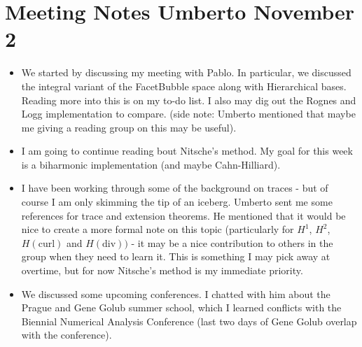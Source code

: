 \documentclass[12pt,a4paper]{article}
\begin{document}
\newpage








\section{Meeting Notes Umberto November 2}

\begin{itemize}

\item We started by discussing my meeting with Pablo. In particular, we discussed the integral variant of the FacetBubble space along with Hierarchical bases. Reading more into this is on my to-do list. I also may dig out the Rognes and Logg implementation to compare. (side note: Umberto mentioned that maybe me giving a reading group on this may be useful). 



\item I am going to continue reading bout Nitsche's method. My goal for this week is a biharmonic implementation (and maybe Cahn-Hilliard). 



\item I have been working through some of the background on traces - but of course I am only skimming the tip of an iceberg. Umberto sent me some references for trace and extension theorems. He mentioned that it would be nice to create a more formal note on this topic (particularly for $H^1$, $H^2$, $H(\text{curl})$ and $H(\text{div}))$ - it may be a nice contribution to others in the group when they need to learn it. This is something I may pick away at overtime, but for now Nitsche's method is my immediate priority.



\item We discussed some upcoming conferences. I chatted with him about the Prague and Gene Golub summer school, which I learned conflicts with the Biennial Numerical Analysis Conference (last two days of Gene Golub overlap with the conference).

\end{itemize}
\end{document}
